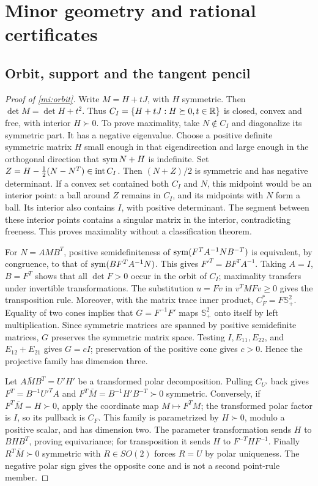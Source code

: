 \section{Minor geometry and rational certificates}\label{mi:appendix}

\subsection{Orbit, support and the tangent pencil}

\begin{proof}[Proof of \cref{mi:orbit}]\label{mi:orbit-proof}
Write $M=H+tJ$, with $H$ symmetric. Then
$\det M=\det H+t^2$. Thus
$C_I=\{H+tJ:H\succeq0,t\in\mathbb R\}$ is closed, convex and free, with
interior $H\succ0$.
To prove maximality, take $N\notin C_I$ and diagonalize its symmetric
part. It has a negative eigenvalue. Choose a positive definite symmetric
matrix $H$ small enough in that eigendirection and large enough in the
orthogonal direction that $\operatorname{sym} N+H$ is indefinite. Set
$Z=H-\tfrac12(N-N^T)\in\operatorname{int} C_I$.
Then $(N+Z)/2$ is symmetric and has negative determinant.
If a convex set contained both $C_I$ and $N$, this midpoint would be an
interior point: a ball around $Z$ remains in $C_I$, and its midpoints
with $N$ form a ball. Its interior also contains $I$, with positive
determinant. The segment between these interior points contains a
singular matrix in the interior, contradicting freeness. This proves
maximality without a classification theorem.

For $N=AMB^T$, positive semidefiniteness of
$\operatorname{sym}(F^TA^{-1}NB^{-T})$ is equivalent, by congruence, to that of
$\operatorname{sym}(BF^TA^{-1}N)$. This gives $F'^T=BF^TA^{-1}$.
Taking $A=I$, $B=F^T$ shows that all $\det F>0$ occur in the orbit of
$C_I$; maximality transfers under invertible transformations.
The substitution $u=Fv$ in $v^TMFv\ge0$ gives the transposition rule.
Moreover, with the matrix trace inner product,
$C_F^*=F\mathbb S_+^2$. Equality of two cones implies that
$G=F^{-1}F'$ maps $\mathbb S_+^2$ onto itself by left multiplication.
Since symmetric matrices are spanned by positive semidefinite matrices,
$G$ preserves the symmetric matrix space. Testing $I,E_{11},E_{22}$,
and $E_{12}+E_{21}$ gives $G=cI$; preservation of the positive cone gives
$c>0$. Hence the projective family has dimension three.

Let $A\bar MB^T=U'H'$ be a transformed polar decomposition.
Pulling $C_{U'}$ back gives
$F^T=B^{-1}U'^TA$ and
$F^T\bar M=B^{-1}H'B^{-T}\succ0$ symmetric.
Conversely, if $F^T\bar M=H\succ0$, apply the coordinate map $M\mapsto F^TM$;
the transformed polar factor is $I$, so its pullback is $C_F$.
This family is parametrized by $H\succ0$, modulo a positive scalar,
and has dimension two. The parameter transformation sends $H$ to
$BHB^T$, proving equivariance; for transposition it sends $H$ to
$F^{-T}HF^{-1}$.
Finally $R^T\bar M\succ0$ symmetric with $R\in SO(2)$ forces $R=U$ by
polar uniqueness. The negative polar sign gives the opposite cone and is
not a second point-rule member.
\end{proof}

